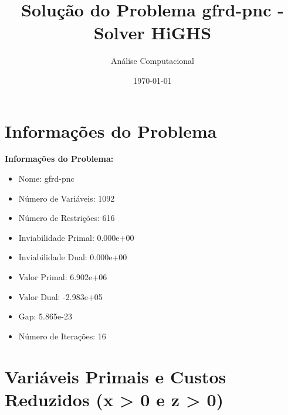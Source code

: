\documentclass[12pt]{article}
\title{Solução do Problema gfrd-pnc - Solver HiGHS}
\author{Análise Computacional}
\date{\today}
\begin{document}
\maketitle

\section{Informações do Problema}

\textbf{Informações do Problema:}
\begin{itemize}
\item Nome: gfrd-pnc
\item Número de Variáveis: 1092
\item Número de Restrições: 616
\item Inviabilidade Primal: 0.000e+00
\item Inviabilidade Dual: 0.000e+00
\item Valor Primal: 6.902e+06
\item Valor Dual: -2.983e+05
\item Gap: 5.865e-23
\item Número de Iterações: 16
\end{itemize}


\section{Variáveis Primais e Custos Reduzidos (x > 0 e z > 0)}
\end{document}
